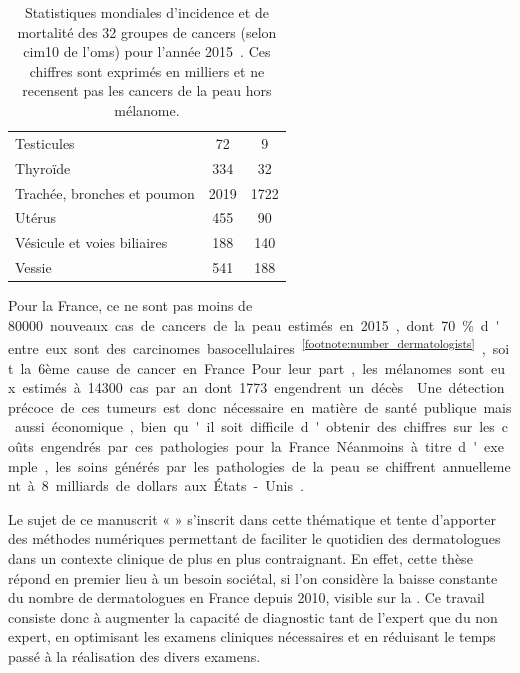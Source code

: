 \begin{table}[H]
\begin{tabular}{lSS}
        Testicules                              & 72                            & 9                         \\
        Thyroïde                                & 334                           & 32                        \\
        Trachée, bronches et poumon             & 2019                          & 1722                      \\
        Utérus                                  & 455                           & 90                        \\
        Vésicule et voies biliaires             & 188                           & 140                       \\
        Vessie                                  & 541                           & 188                       \\ \bottomrule
    \end{tabular}
    \caption{Statistiques mondiales d’incidence et de mortalité des 32 groupes de cancers (selon \gls{cim10} de l'\gls{oms}) pour l'année 2015~\cite{Fitzmaurice2017}. Ces chiffres sont exprimés en milliers et ne recensent pas les cancers de la peau hors mélanome.}
    \label{tab:introduction_cancer_incidence}
\end{table}

Pour la France, ce ne sont pas moins de \SI{80000} nouveaux cas de cancers de la peau estimés en 2015, dont 70~\% d'entre eux sont des carcinomes basocellulaires~\textsuperscript{\ref{footnote:number_dermatologists}}, soit la 6ème cause de cancer en France. Pour leur part, les mélanomes sont eux estimés à \SI{14300} cas par an dont \SI{1773} engendrent un décès~\cite{Thuret2012}. Une détection précoce de ces tumeurs est donc nécessaire en matière de santé publique mais aussi économique, bien qu'il soit difficile d'obtenir des chiffres sur les coûts engendrés par ces pathologies pour la France. Néanmoins à titre d'exemple, les soins générés par les pathologies de la peau se chiffrent annuellement à 8 milliards de dollars aux États-Unis~\cite{Farberg2017a}.\par

\addtocounter{footnote}{1}

Le sujet de ce manuscrit « \titleref » s’inscrit dans cette thématique et tente d’apporter des méthodes numériques permettant de faciliter le quotidien des dermatologues dans un contexte clinique de plus en plus contraignant. En effet, cette thèse répond en premier lieu à un besoin sociétal, si l'on considère la baisse constante du nombre de dermatologues en France depuis 2010, visible sur la . Ce travail consiste donc à augmenter la capacité de diagnostic tant de l'expert que du non expert, en optimisant les examens cliniques nécessaires et en réduisant le temps passé à la réalisation des divers examens.\par

